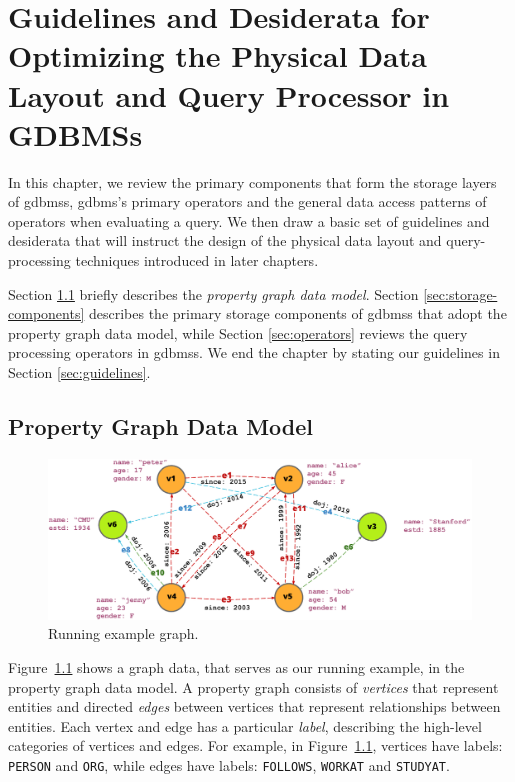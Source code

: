 \chapter{Guidelines and Desiderata for Optimizing the Physical Data Layout and Query Processor in GDBMSs}
\label{c:guidelines}

In this chapter, we review the primary components that form the storage layers of \gls{gdbms}s, \gls{gdbms}'s primary operators and the general data access patterns of operators when evaluating a query. We then draw a basic set of guidelines and desiderata that will instruct the design of the physical data layout and query-processing techniques introduced in later chapters.

Section \ref{sec:property-graph-data-model} briefly describes the \emph{property graph data model}. Section \ref{sec:storage-components} describes the primary storage components of \gls{gdbms}s that adopt the property graph data model, while Section \ref{sec:operators} reviews the query processing operators in \gls{gdbms}s. We end the chapter by stating our guidelines in Section \ref{sec:guidelines}.

\section{Property Graph Data Model}
\label{sec:property-graph-data-model}

\begin{figure}
	\includegraphics[scale=0.86]{img/property-graph}
	\vspace{-8pt}
	\caption{Running example graph.}
	\label{fig:runn}
	\vspace{-8pt}
\end{figure}

Figure~\ref{fig:runn} shows a graph data, that serves as our running example, in the property graph data model. A property graph consists of \emph{vertices} that represent entities and directed \emph{edges} between vertices that represent relationships between entities. Each vertex and edge has a particular \emph{label}, describing the high-level categories of vertices and edges. For example, in Figure~\ref{fig:runn}, vertices have labels: \texttt{PERSON} and \texttt{ORG}, while edges have labels: \texttt{FOLLOWS}, \texttt{WORKAT} and \texttt{STUDYAT}.

